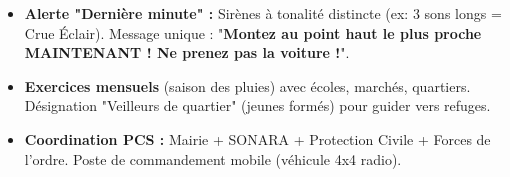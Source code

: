 \documentclass[11pt]{article}
\begin{document}
\begin{exoresolu}
\begin{enumerate}
\begin{itemize}
              \item \textbf{Alerte "Dernière minute" :} Sirènes à tonalité distincte (ex: 3 sons longs = Crue Éclair). Message unique : "\textbf{Montez au point haut le plus proche MAINTENANT ! Ne prenez pas la voiture !}".
              \item \textbf{Exercices mensuels} (saison des pluies) avec écoles, marchés, quartiers. Désignation "Veilleurs de quartier" (jeunes formés) pour guider vers refuges.
              \item \textbf{Coordination PCS :} Mairie + SONARA + Protection Civile + Forces de l'ordre. Poste de commandement mobile (véhicule 4x4 radio).
          \end{itemize}
\end{enumerate}
\end{exoresolu}
\end{document}
